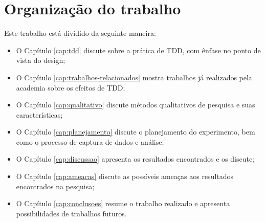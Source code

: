\section{Organização do trabalho}

Este trabalho está dividido da seguinte maneira: 

\begin{itemize}
	\item O Capítulo \ref{cap:tdd} discute sobre a prática de TDD, com ênfase no
	ponto de vista do design;
  
	\item O Capítulo \ref{cap:trabalhos-relacionados} mostra trabalhos já
	realizados pela academia sobre os efeitos de TDD;

 	\item O Capítulo \ref{cap:qualitativo} discute métodos qualitativos de
 	pesquisa e suas características;

	\item O Capítulo \ref{cap:planejamento} discute o planejamento do experimento,
	bem como o processo de captura de dados e análise;

	\item O Capítulo \ref{cap:discussao} apresenta os resultados encontrados e
	os discute;
	
	\item O Capítulo \ref{cap:ameacas} discute as possíveis ameaças aos resultados
	encontrados na pesquisa;
	
	\item O Capítulo \ref{cap:conclusoes} resume o trabalho realizado e apresenta
	possibilidades de trabalhos futuros.
\end{itemize}

